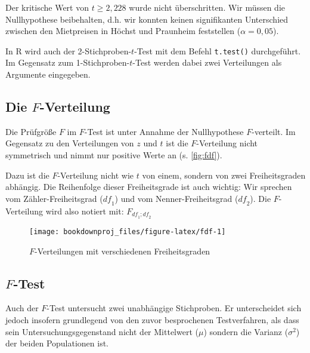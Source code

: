 \documentclass[
  ngerman,
]{article}
\begin{document}
Der kritische Wert von \(t \geq 2{,}228\) wurde nicht überschritten. Wir müssen die Nullhypothese beibehalten, d.h. wir konnten keinen signifikanten Unterschied zwischen den Mietpreisen in Höchst und Praunheim feststellen (\(\alpha=0{,}05\)).

\begin{rtip}
In R wird auch der 2-Stichproben-$t$-Test mit dem Befehl {\tt t.test()} durchgeführt. Im Gegensatz zum 1-Stichproben-$t$-Test werden dabei zwei Verteilungen als Argumente eingegeben.
\end{rtip}

\hypertarget{die-f-verteilung}{%
\subsection{\texorpdfstring{Die \(F\)-Verteilung}{Die F-Verteilung}}\label{die-f-verteilung}}

Die Prüfgröße \(F\) im \(F\)-Test ist unter Annahme der Nullhypothese \(F\)-verteilt. Im Gegensatz zu den Verteilungen von \(z\) und \(t\) ist die \(F\)-Verteilung nicht symmetrisch und nimmt nur positive Werte an (s. \autoref{fig:fdf}).

Dazu ist die \(F\)-Verteilung nicht wie \(t\) von einem, sondern von zwei Freiheitsgraden abhängig. Die Reihenfolge dieser Freiheitsgrade ist auch wichtig: Wir sprechen vom Zähler-Freiheitsgrad (\(\mathit{df}_1\)) und vom Nenner-Freiheitsgrad (\(\mathit{df}_2\)). Die \(F\)-Verteilung wird also notiert mit: \(F_{\mathit{df}_1;\mathit{df}_2}\)

\begin{figure}[h]

{\centering \texttt{[image: bookdownproj\_files/figure-latex/fdf-1]} 

}

\caption{$F$-Verteilungen mit verschiedenen Freiheitsgraden}\label{fig:fdf}
\end{figure}

\hypertarget{f}{%
\subsection{\texorpdfstring{\(F\)-Test}{F-Test}}\label{f}}

Auch der \(F\)-Test untersucht zwei unabhängige Stichproben. Er unterscheidet sich jedoch insofern grundlegend von den zuvor besprochenen Testverfahren, als dass sein Untersuchungsgegenstand nicht der Mittelwert (\(\mu\)) sondern die Varianz (\(\sigma^2\)) der beiden Populationen ist.
\end{document}
